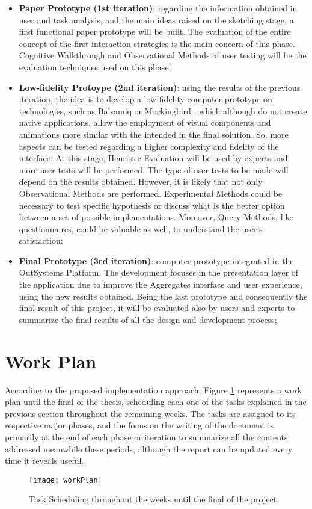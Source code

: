 \begin{itemize}
    \begin{itemize}
        \item \textbf{Paper Prototype (1st iteration)}: regarding the information obtained in user and task analysis, and the main ideas raised on the sketching stage, a first functional paper prototype will be built. The evaluation of the entire concept of the first interaction strategies is the main concern of this phase. Cognitive Walkthrough and Observational Methods of user testing will be the evaluation techniques used on this phase;
        \item \textbf{Low-fidelity Protoype (2nd iteration)}: using the results of the previous iteration, the idea is to develop a low-fidelity computer prototype on technologies, such as Balsamiq \cite{balsamiq} or Mockingbird \cite{mockingbird}, which although do not create native applications, allow the employment of visual components and animations more similar with the intended in the final solution. So, more aspects can be tested regarding a higher complexity and fidelity of the interface. At this stage, Heuristic Evaluation will be used by experts and more user tests will be performed. The type of user tests to be made will depend on the results obtained. However, it is likely that not only Observational Methods are performed. Experimental Methods could be necessary to test specific hypothesis or discuss what is the better option between a set of possible implementations. Moreover, Query Methods, like questionnaires, could be valuable as well, to understand the user’s satisfaction;
        \item \textbf{Final Prototype (3rd iteration)}: computer prototype integrated in the OutSystems Platform. The development focuses in the presentation layer of the application due to improve the Aggregates interface and user experience, using the new results obtained. Being the last prototype and consequently the final result of this project, it will be evaluated also by users and experts to summarize the final results of all the design and development process;
    \end{itemize}

\end{itemize}

\section{Work Plan}
\label{sec:work_plan}
According to the proposed implementation approach, Figure \ref{fig:work_plan} represents a work plan until the final of the thesis, scheduling each one of the tasks explained in the previous section throughout the remaining weeks. The tasks are assigned to its respective major phases, and the focus on the writing of the document is primarily at the end of each phase or iteration to summarize all the contents addressed meanwhile these periods, although the report can be updated every time it reveals useful.

\begin{figure}[htbp]
	\centering
	\texttt{[image: workPlan]}
	\caption{Task Scheduling throughout the weeks until the final of the project.}
	\label{fig:work_plan}
\end{figure}



